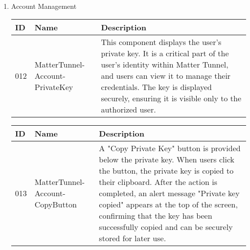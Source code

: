 \documentclass[conference]{IEEEtran}
\begin{document}
\begin{enumerate}[itemsep=2ex, parsep=1ex]
\begin{enumerate}[itemsep=2ex, parsep=1ex]
	      	      \vspace{5cm}
	      	      
	      	\item Account Management
	      	      \begin{table}[h!]
	      	      	\def\arraystretch{1.24} \small
	      	      	\begin{tabular}{|p{1.2cm}|p{2.5cm}|p{4.0cm}|}
	      	      		\hline
	      	      		ID  & Name                            & Description                                                                                                                                                                                                                                              \\
	      	      		\hline
	      	      		012 & MatterTunnel-Account-PrivateKey & This component displays the user's private key. It is a critical part of the user's identity within Matter Tunnel, and users can view it to manage their credentials. The key is displayed securely, ensuring it is visible only to the authorized user. \\
	      	      		\hline
	      	      	\end{tabular}
	      	      \end{table}
	      	      
	      	      \begin{table}[h!]
	      	      	\def\arraystretch{1.24} \small
	      	      	\begin{tabular}{|p{1.2cm}|p{2.5cm}|p{4.0cm}|}
	      	      		\hline
	      	      		ID  & Name                            & Description                                                                                                                                                                                                                                                                                                                                     \\
	      	      		\hline
	      	      		013 & MatterTunnel-Account-CopyButton & A "Copy Private Key" button is provided below the private key. When users click the button, the private key is copied to their clipboard. After the action is completed, an alert message "Private key copied" appears at the top of the screen, confirming that the key has been successfully copied and can be securely stored for later use. \\
	      	      		\hline
	      	      	\end{tabular}
	      	      \end{table}
	      	      

\end{enumerate}
\end{enumerate}
\end{document}
